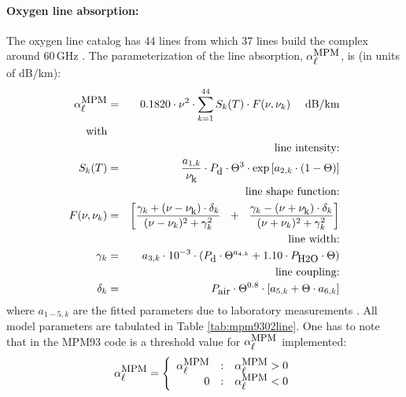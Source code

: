 \paragraph{Oxygen line absorption:}
\label{levele:mpm93_o2lines}
The oxygen line catalog has 44 lines from which 37 lines build the 
complex around 60\,GHz \citep{liebeetal:93}. The parameterization 
of the line absorption, $\alpha^{\mbox{\rm \small MPM}}_{\mbox{\small $\ell$}}$, is (in units of dB/km):
\begin{eqnarray}
  \alphampml & = & 0.1820 \cdot \nu^2 \cdot  
                   \sum_{k=1}^{44}{S_k(T) \cdot F(\nu,\nu_k)}~~~~\mbox{dB/km}\\
%
 \mbox{with} &   &\nonumber\\
%
 & & \mbox{line intensity:} \nonumber\\
      \label{eq:abs_theory:MPM93:O2_inten}
      S_k(T) & = & \frac{a_{1,k}}{\nuk} \cdot \pda \cdot \Theta^3 \cdot 
                   \exp{[a_{2,k} \cdot (1-\Theta)]}\\
 & & \mbox{line shape function:}  \nonumber\\
 F(\nu,\nu_k) & = & \left[\frac{\gamma_k+(\nu-\nuk)\cdot \delta_k}
                               {(\nu-\nu_k)^2+\gamma_k^2}~~+~~
                          \frac{\gamma_k-(\nu+\nuk)\cdot \delta_k}
                               {(\nu+\nu_k)^2+\gamma_k^2}\right] \nonumber\\
 & & \mbox{line width:}  \nonumber\\
     \label{eq:abs_theory:MPM93:O2_gamma}
     \gamma_k & = & a_{3,k} \cdot 10^{-3} \cdot 
                 \left( \pda  \cdot \Theta^{a_{4,k}} + 
                        1.10 \cdot \phzo \cdot \Theta \right)\\
& &  \mbox{line coupling:}  \nonumber\\
     \label{eq:abs_theory:MPM93:O2_coupling}
     \delta_k & = & \pdair \cdot \Theta^{0.8} \cdot 
                   \left[ a_{5,k} + \Theta \cdot a_{6,k} \right]\nonumber
\nonumber
\end{eqnarray}
%
where $a_{1-5,k}$ are the fitted parameters due to laboratory measurements 
\citep{liebeetal:92}. All model parameters are tabulated in 
Table \ref{tab:mpm9302line}. One has to note that in the MPM93 code is a 
threshold value for $\alpha^{\mbox{\rm \small MPM}}_{\mbox{\small $\ell$}}$ implemented:
\begin{equation}
 \label{eq:abs_theory:mpm93O2limit}
  \alphampml = 
   \left \{ \begin{array}{r@{\quad:\quad}l} 
    \alphampml & \alphampml > 0\\
    0          & \alphampml < 0
                       \end{array} \right.
\end{equation}
